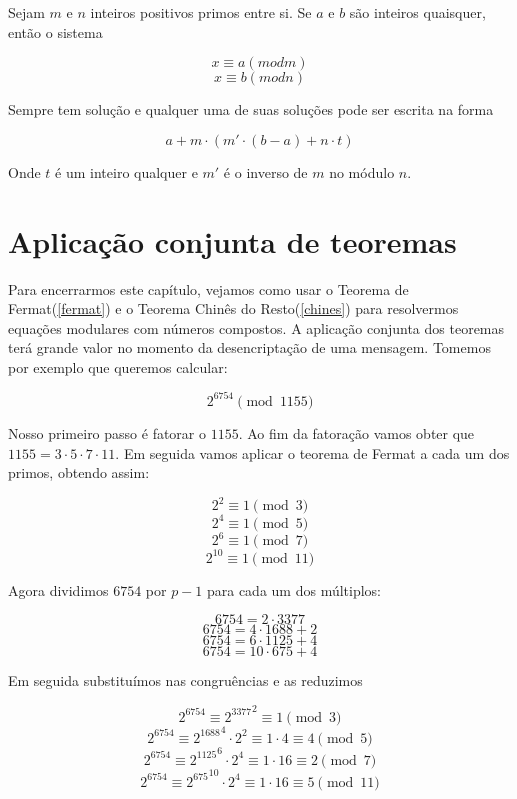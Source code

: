 \begin{Th}\label{chines}

Sejam $m$ e $n$ inteiros positivos primos entre si. Se $a$ e $b$ s\~ao inteiros quaisquer, ent\~ao o sistema

$$ x \equiv a (mod m) $$
$$ x \equiv b (mod n) $$

Sempre tem solu\c{c}\~ao e qualquer uma de suas solu\c{c}\~oes pode ser escrita na forma

$$ a + m \cdot(m' \cdot (b-a) + n \cdot t) $$

Onde $t$ \'e um inteiro qualquer e $m'$ \'e o inverso de $m$ no m\'odulo $n$.

\end{Th}

\section{Aplica\c{c}\~ao conjunta de teoremas}

Para encerrarmos este cap\'itulo, vejamos como usar o Teorema de Fermat(\ref{fermat}) e o Teorema Chin\^es do Resto(\ref{chines}) para resolvermos equa\c{c}\~oes modulares com n\'umeros compostos. A aplica\c{c}\~ao conjunta dos teoremas ter\'a grande valor no momento da desencripta\c{c}\~ao de uma mensagem. Tomemos por exemplo que queremos calcular:

$$ 2^{6754} \pmod{1155}$$

Nosso primeiro passo \'e fatorar o $1155$. Ao fim da fatora\c{c}\~ao vamos obter que $1155 = 3 \cdot 5 \cdot 7 \cdot 11$. Em seguida vamos aplicar o teorema de Fermat a cada um dos primos, obtendo assim:

$$ 2^2 \equiv 1 \pmod{3}$$
$$ 2^4 \equiv 1 \pmod{5}$$ 
$$ 2^6 \equiv 1 \pmod{7}$$  
$$ 2^{10} \equiv 1 \pmod{11}$$

Agora dividimos $6754$ por $p-1$ para cada um dos m\'ultiplos:

$$6754 = 2 \cdot 3377 $$
$$6754 = 4 \cdot 1688 + 2$$
$$6754 = 6 \cdot 1125 + 4$$
$$6754 = 10 \cdot 675 + 4$$ 

Em seguida substitu\'imos nas congru\^encias e as reduzimos

$$2^{6754} \equiv {2^{3377}}^{2} \equiv 1 \pmod{3} $$  
$$2^{6754} \equiv {2^{1688}}^{4} \cdot 2^2 \equiv 1 \cdot 4 \equiv  4 \pmod{5}$$  
$$2^{6754} \equiv {2^{1125}}^{6} \cdot 2^4 \equiv 1 \cdot 16\equiv  2 \pmod{7}$$ 
$$2^{6754} \equiv {2^{675}}^{10} \cdot 2^4 \equiv 1 \cdot 16\equiv  5 \pmod{11}$$  

